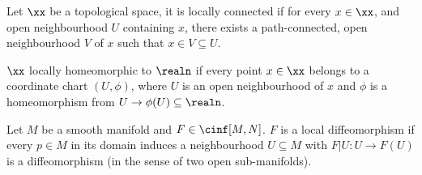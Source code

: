 \documentclass[../main-v2-manifolds.tex]{subfiles}
\begin{document}
\begin{definition}\label{chp4:locally-path-connected-definition}
    Let $\xx$ be a topological space, it is locally connected if for every $x\in\xx$, and open neighbourhood $U$ containing $x$, there exists a path-connected, open neighbourhood $V$ of $x$ such that $x\in V\subseteq U$.
\end{definition}

\begin{definition}\label{chp4:locally-homeomorphic-definition}
    $\xx$ locally homeomorphic to $\realn$ if every point $x\in\xx$ belongs to a coordinate chart $(U,\phi)$, where $U$ is an open neighbourhood of $x$ and $\phi$ is a homeomorphism from $U\to\phi(U)\subseteq\realn$.
\end{definition}

\begin{definition}\label{lee-chp4:local-diffeomorphism-definition}
    Let $M$ be a smooth manifold and $F\in \cinf[M,N]$. $F$ is a local diffeomorphism if every $p\in M$ in its domain induces a neighbourhood $U\subseteq M$ with $F|U:U\to F(U)$ is a diffeomorphism (in the sense of two open sub-manifolds).
\end{definition}
\end{document}
